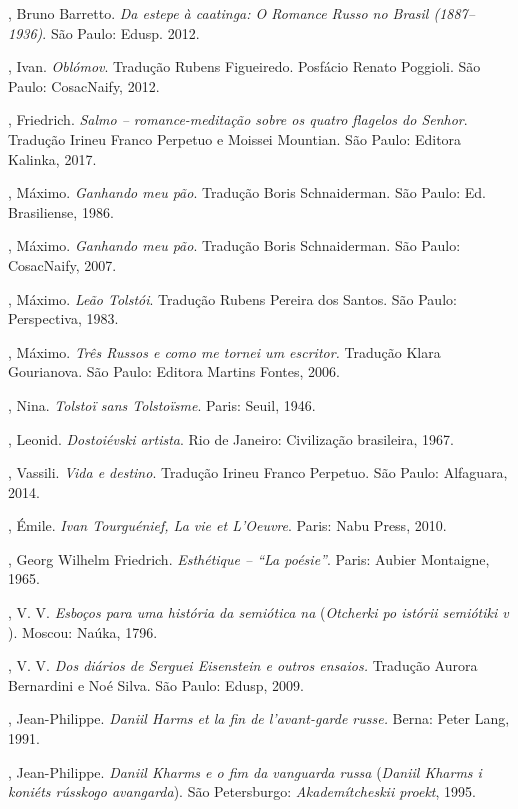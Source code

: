 \begin{Parskip}
{, Bruno Barretto. \emph{Da estepe à caatinga: O Romance Russo no Brasil (1887--1936)}. São Paulo:  Edusp. 2012.

, Ivan. \emph{Oblómov}. Tradução Rubens Figueiredo. Posfácio Renato Poggioli.
São Paulo: CosacNaify, 2012.

, Friedrich. \emph{Salmo -- romance-meditação sobre os quatro flagelos do Senhor}. Tradução Irineu Franco Perpetuo e Moissei Mountian. São Paulo: Editora Kalinka, 2017.

, Máximo. \emph{Ganhando meu pão}. Tradução Boris Schnaiderman. São Paulo: Ed. Brasiliense, 1986.

, Máximo. \emph{Ganhando meu pão}. Tradução Boris Schnaiderman. São Paulo: CosacNaify, 2007.

, Máximo. \emph{Leão Tolstói}. Tradução Rubens Pereira dos Santos. São Paulo: Perspectiva, 1983.

, Máximo. \emph{Três Russos e como me tornei um escritor.} Tradução Klara Gourianova. São Paulo: Editora Martins Fontes, 2006.

, Nina. \emph{Tolstoï sans Tolstoïsme}. Paris: Seuil, 1946.

, Leonid. \emph{Dostoiévski artista}. Rio de Janeiro: Civilização brasileira, 1967.

, Vassili. \emph{Vida e destino}. Tradução Irineu Franco Perpetuo. São Paulo: Alfaguara, 2014.

, Émile. \emph{Ivan Tourguénief, La vie et L'Oeuvre}. Paris: Nabu
Press, 2010.

, Georg Wilhelm Friedrich. \emph{Esthétique -- ``La
poésie''}. Paris: Aubier Montaigne, 1965.

, V. V. \emph{Esboços para uma história da semiótica na } (\emph{Otcherki po istórii semiótiki v }). Moscou: Naúka, 1796.

, V. V. \emph{Dos diários de Serguei Eisenstein e outros ensaios.} Tradução Aurora Bernardini e Noé Silva. São Paulo: Edusp, 2009.

, Jean-Philippe. \emph{Daniil Harms et la fin de l'avant-garde russe.} Berna: Peter Lang, 1991.

, Jean-Philippe. \emph{Daniil Kharms e o fim da vanguarda russa} (\emph{Daniil Kharms i koniéts rússkogo avangarda}). São Petersburgo: \emph{Akademítcheskii proekt}, 1995.

}
\end{Parskip}

